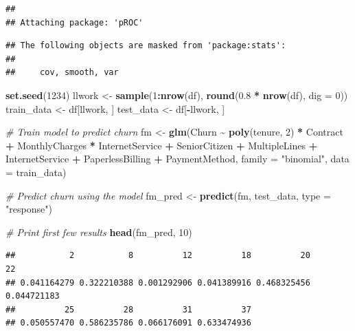 \documentclass[
]{article}
\newenvironment{Shaded}{\begin{snugshade}}{\end{snugshade}}
\newcommand{\AttributeTok}[1]{\textcolor[rgb]{0.13,0.29,0.53}{#1}}
\newcommand{\CommentTok}[1]{\textcolor[rgb]{0.56,0.35,0.01}{\textit{#1}}}
\newcommand{\DecValTok}[1]{\textcolor[rgb]{0.00,0.00,0.81}{#1}}
\newcommand{\FloatTok}[1]{\textcolor[rgb]{0.00,0.00,0.81}{#1}}
\newcommand{\FunctionTok}[1]{\textcolor[rgb]{0.13,0.29,0.53}{\textbf{#1}}}
\newcommand{\NormalTok}[1]{#1}
\newcommand{\OtherTok}[1]{\textcolor[rgb]{0.56,0.35,0.01}{#1}}
\newcommand{\SpecialCharTok}[1]{\textcolor[rgb]{0.81,0.36,0.00}{\textbf{#1}}}
\newcommand{\StringTok}[1]{\textcolor[rgb]{0.31,0.60,0.02}{#1}}
\begin{document}
\begin{verbatim}
## 
## Attaching package: 'pROC'
\end{verbatim}

\begin{verbatim}
## The following objects are masked from 'package:stats':
## 
##     cov, smooth, var
\end{verbatim}

\begin{Shaded}
\begin{Highlighting}[]
\FunctionTok{set.seed}\NormalTok{(}\DecValTok{1234}\NormalTok{)}
\NormalTok{llwork }\OtherTok{\textless{}{-}} \FunctionTok{sample}\NormalTok{(}\DecValTok{1}\SpecialCharTok{:}\FunctionTok{nrow}\NormalTok{(df), }\FunctionTok{round}\NormalTok{(}\FloatTok{0.8} \SpecialCharTok{*} \FunctionTok{nrow}\NormalTok{(df), }\AttributeTok{dig =} \DecValTok{0}\NormalTok{))}
\NormalTok{train\_data }\OtherTok{\textless{}{-}}\NormalTok{ df[llwork, ]}
\NormalTok{test\_data }\OtherTok{\textless{}{-}}\NormalTok{ df[}\SpecialCharTok{{-}}\NormalTok{llwork, ]}

\CommentTok{\# Train model to predict churn}
\NormalTok{fm }\OtherTok{\textless{}{-}} \FunctionTok{glm}\NormalTok{(Churn }\SpecialCharTok{\textasciitilde{}} \FunctionTok{poly}\NormalTok{(tenure, }\DecValTok{2}\NormalTok{) }\SpecialCharTok{*}\NormalTok{ Contract }\SpecialCharTok{+}\NormalTok{ MonthlyCharges }\SpecialCharTok{*}\NormalTok{ InternetService }\SpecialCharTok{+}\NormalTok{ SeniorCitizen }\SpecialCharTok{+}\NormalTok{ MultipleLines }\SpecialCharTok{+}\NormalTok{ InternetService }\SpecialCharTok{+}\NormalTok{ PaperlessBilling }\SpecialCharTok{+}\NormalTok{ PaymentMethod, }\AttributeTok{family =} \StringTok{"binomial"}\NormalTok{, }\AttributeTok{data =}\NormalTok{ train\_data)}

\CommentTok{\# Predict churn using the model}
\NormalTok{fm\_pred }\OtherTok{\textless{}{-}} \FunctionTok{predict}\NormalTok{(fm, test\_data, }\AttributeTok{type =} \StringTok{"response"}\NormalTok{)}

\CommentTok{\# Print first few results}
\FunctionTok{head}\NormalTok{(fm\_pred, }\DecValTok{10}\NormalTok{)}
\end{Highlighting}
\end{Shaded}

\begin{verbatim}
##           2           8          12          18          20          22 
## 0.041164279 0.322210388 0.001292906 0.041389916 0.468325456 0.044721183 
##          25          28          31          37 
## 0.050557470 0.586235786 0.066176091 0.633474936
\end{verbatim}
\end{document}
